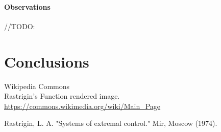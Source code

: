\documentclass{article}
\begin{document}
\paragraph{Observations} //TODO:

\section{Conclusions}



\begin{thebibliography}{9}

  Wikipedia Commons \\ Rastrigin's Function rendered image.
  \url{https://commons.wikimedia.org/wiki/Main_Page}

  Rastrigin, L. A. "Systems of extremal control." Mir, Moscow (1974).
\end{thebibliography}  
\end{document}
